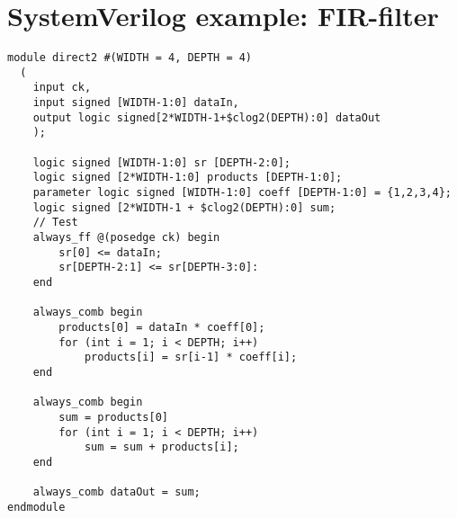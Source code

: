 \section{SystemVerilog example: FIR-filter}
\lstset{language=SystemVerilog, style=Verilogstyle}
\begin{lstlisting}[caption={FIR-filter implemented in SystemVerilog. Example from \cite{mehler2014digital}},label=lst:firfiltersystemverilog]
module direct2 #(WIDTH = 4, DEPTH = 4)
  (
	input ck, 
	input signed [WIDTH-1:0] dataIn,
	output logic signed[2*WIDTH-1+$clog2(DEPTH):0] dataOut
	);
	
	logic signed [WIDTH-1:0] sr [DEPTH-2:0];
	logic signed [2*WIDTH-1:0] products [DEPTH-1:0];
	parameter logic signed [WIDTH-1:0] coeff [DEPTH-1:0] = {1,2,3,4};
	logic signed [2*WIDTH-1 + $clog2(DEPTH):0] sum;
	// Test
	always_ff @(posedge ck) begin
		sr[0] <= dataIn;
		sr[DEPTH-2:1] <= sr[DEPTH-3:0]:
	end
	
	always_comb begin
		products[0] = dataIn * coeff[0];
		for (int i = 1; i < DEPTH; i++)
			products[i] = sr[i-1] * coeff[i];
	end
	
	always_comb begin
		sum = products[0]
		for (int i = 1; i < DEPTH; i++)
			sum = sum + products[i];
	end
	
	always_comb dataOut = sum;
endmodule
\end{lstlisting}
\clearpage
